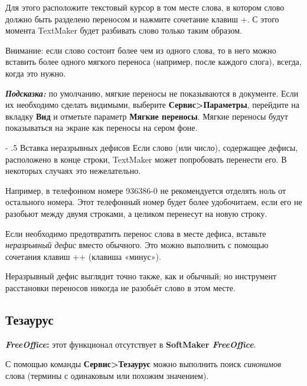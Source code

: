 ﻿\documentclass[a4paper,10pt]{article}
\makeatletter
\renewcommand\paragraph{%
   \@startsection{paragraph}{4}{0mm}%
      {-\baselineskip}%
      {.5\baselineskip}%
      {\normalfont\normalsize\bfseries}}
\makeatother
\begin{document}
Для этого расположите текстовый курсор в том месте слова, в котором слово должно быть разделено переносом и нажмите сочетание клавиш +\keys{-}. С этого момента TextMaker будет разбивать слово только таким образом.

Внимание: если слово состоит более чем из одного слова, то в него можно вставить более одного мягкого переноса (например, после каждого слога), всегда, когда это нужно.

\begin{mdframed}[backgroundcolor=blue!10]
\textbf{\textit{Подсказка:}} по умолчанию,  мягкие переносы не показываются в документе. Если их необходимо сделать видимыми, выберите \textbf{Сервис>Параметры}, перейдите на вкладку \textbf{Вид} и отметьте параметр \textbf{Мягкие переносы}. Мягкие переносы будут показываться на экране как переносы на сером фоне.
\end{mdframed}

\paragraph{Вставка неразрывных дефисов}
Если слово (или число), содержащее дефисы, расположено в конце строки, TextMaker может попробовать перенести его. В некоторых случаях это нежелательно.

Например, в телефонном номере 936386-0 не рекомендуется отделять ноль от остального номера. Этот телефонный номер будет более удобочитаем, если его не разобьют между двумя строками, а целиком перенесут на новую строку.

Если необходимо предотвратить перенос слова в месте дефиса, вставьте \textit{неразрывный дефис} вместо обычного. Это можно выполнить с помощью сочетания клавиш ++\keys{-} (клавиша «минус»).

Неразрывный дефис выглядит точно также, как и обычный; но инструмент расстановки переносов никогда не разобьёт слово в этом месте.

\subsection{Тезаурус}
\begin{mdframed}[backgroundcolor=pink!50]
\textbf{\textit{FreeOffice}:} этот функционал отсутствует в \textbf{SoftMaker \textit{FreeOffice}}.
\end{mdframed}

С помощью команды \textbf{Сервис>Тезаурус} можно выполнить поиск \textit{синонимов} слова (термины с одинаковым или похожим значением).
\end{document}
